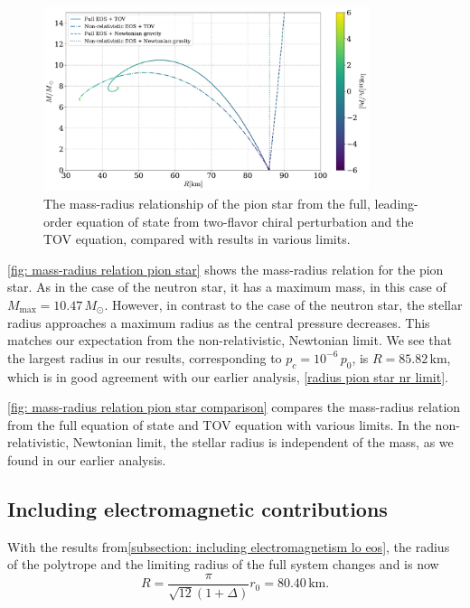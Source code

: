 \begin{figure}[!h]
    \centering
    \includegraphics[width=0.85\textwidth]{../scripts/figurer/pion_star/mass_radius_comparison.pdf}
    \caption{
        The mass-radius relationship of the pion star from the full, leading-order equation of state from two-flavor chiral perturbation and the TOV equation, compared with results in various limits.
        }
        \label{fig: mass-radius relation pion star comparison}
\end{figure}


\autoref{fig: mass-radius relation pion star} shows the mass-radius relation for the pion star.
As in the case of the neutron star, it has a maximum mass, in this case of $M_\text{max} = 10.47\, M_\odot$.
However, in contrast to the case of the neutron star, the stellar radius approaches a maximum radius as the central pressure decreases.
This matches our expectation from the non-relativistic, Newtonian limit.
We see that the largest radius in our results, corresponding to  $p_c = 10^{-6} \, p_0$, is $R = 85.82 \, \text{km}$, which is in good agreement with our earlier analysis, \autoref{radius pion star nr limit}.

\autoref{fig: mass-radius relation pion star comparison} compares the mass-radius relation from the full equation of state and TOV equation with various limits.
In the non-relativistic, Newtonian limit, the stellar radius is independent of the mass, as we found in our earlier analysis.


\subsection{Including electromagnetic contributions}


With the results from\autoref{subsection: including electromagnetism lo eos}, the radius of the polytrope and the limiting radius of the full system changes and is now
%
\begin{equation}
    \label{maximum mass pion star with em interaction}
    R = \frac{\pi}{\sqrt{12}(1 + \Delta)} r_0 = 80.40 \, \text{km}.
\end{equation}


